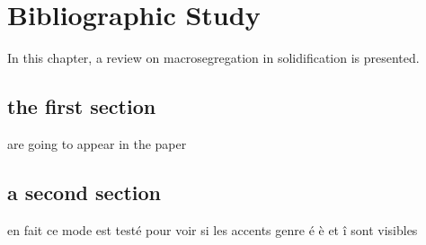 \chapter{Bibliographic Study}
In this chapter, a review on macrosegregation in solidification is presented. 
\minitoc
\newpage


\section{the first section}
\cite{carozzani_direct_2013} are going to appear in the paper 

\section{a second section}
en fait ce mode est testé pour voir si les accents genre é è et î sont visibles
